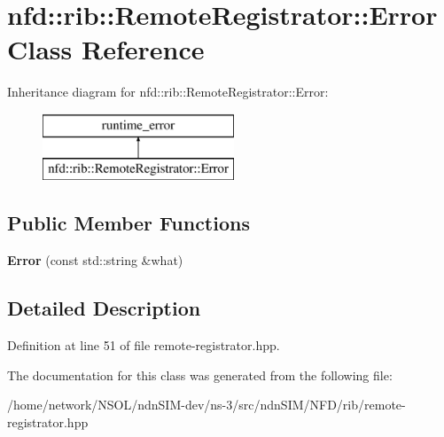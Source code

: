 \hypertarget{classnfd_1_1rib_1_1RemoteRegistrator_1_1Error}{}\section{nfd\+:\+:rib\+:\+:Remote\+Registrator\+:\+:Error Class Reference}
\label{classnfd_1_1rib_1_1RemoteRegistrator_1_1Error}
Inheritance diagram for nfd\+:\+:rib\+:\+:Remote\+Registrator\+:\+:Error\+:\begin{figure}[H]
\begin{center}
\leavevmode
\includegraphics[height=2.000000cm]{classnfd_1_1rib_1_1RemoteRegistrator_1_1Error}
\end{center}
\end{figure}
\subsection*{Public Member Functions}
\begin{DoxyCompactItemize}
\item 
{\bfseries Error} (const std\+::string \&what)\hypertarget{classnfd_1_1rib_1_1RemoteRegistrator_1_1Error_a3bc3d7005eefb31c8128eaf40484239f}{}\label{classnfd_1_1rib_1_1RemoteRegistrator_1_1Error_a3bc3d7005eefb31c8128eaf40484239f}

\end{DoxyCompactItemize}


\subsection{Detailed Description}


Definition at line 51 of file remote-\/registrator.\+hpp.



The documentation for this class was generated from the following file\+:\begin{DoxyCompactItemize}
\item 
/home/network/\+N\+S\+O\+L/ndn\+S\+I\+M-\/dev/ns-\/3/src/ndn\+S\+I\+M/\+N\+F\+D/rib/remote-\/registrator.\+hpp\end{DoxyCompactItemize}
